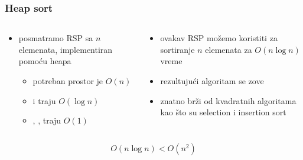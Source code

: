 \documentclass[compress]{beamer}
\begin{document}
\begin{frame}[fragile]
  \frametitle{Heap sort}
  \begin{columns}
    \begin{column}[c]{6cm}
      \begin{itemize}
        \item posmatramo RSP sa $n$ elemenata, implementiran pomoću heapa
        \begin{itemize}
          \item potreban prostor je $O(n)$
          \item {} i  traju $O(\log n)$
          \item {}, ,  traju $O(1)$
        \end{itemize}
      \end{itemize}
    \end{column}
    \begin{column}[c]{6cm}
      \begin{itemize}
        \item ovakav RSP možemo koristiti za sortiranje $n$ elemenata za $O(n\log n)$ vreme
        \item rezultujući algoritam se zove 
        \item znatno brži od kvadratnih algoritama kao što su selection i insertion sort
      \end{itemize}
    \end{column}
  \end{columns}
  $$O(n\log n) < O(n^2)$$
\end{frame}
\end{document}
